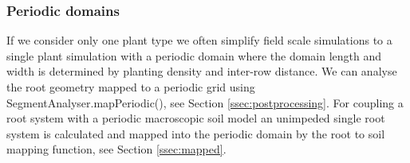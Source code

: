 \subsubsection*{Periodic domains}

If we consider only one plant type we often simplify field scale simulations to a single plant simulation with a periodic domain where the domain length and width is determined by planting density and inter-row distance. We can analyse the root geometry mapped to a periodic grid using SegmentAnalyser.mapPeriodic(), see Section \ref{ssec:postprocessing}. For coupling a root system with a periodic macroscopic soil model an unimpeded single root system is calculated and mapped into the periodic domain by the root to soil mapping function, see Section \ref{ssec:mapped}.



